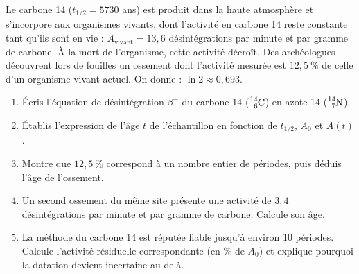 \documentclass[11pt]{article}
\begin{document}
\begin{exercice}
Le carbone 14 ($t_{1/2} = 5730$ ans) est produit dans la haute atmosphère et s'incorpore aux organismes vivants, dont l'activité en carbone 14 reste constante tant qu'ils sont en vie : $A_{\mathrm{vivant}} = 13,6$ désintégrations par minute et par gramme de carbone. À la mort de l'organisme, cette activité décroît.
Des archéologues découvrent lors de fouilles un ossement dont l'activité mesurée est $12,5\ \%$ de celle d'un organisme vivant actuel.
On donne : $\ln 2 \approx 0,693$.
\begin{enumerate}
\item Écris l'équation de désintégration $\beta^-$ du carbone 14 ($\ce{^{14}_{6}C}$) en azote 14 ($\ce{^{14}_{7}N}$).
\item Établis l'expression de l'âge $t$ de l'échantillon en fonction de $t_{1/2}$, $A_0$ et $A(t)$.
\item Montre que $12,5\ \%$ correspond à un nombre entier de périodes, puis déduis l'âge de l'ossement.
\item Un second ossement du même site présente une activité de $3,4$ désintégrations par minute et par gramme de carbone. Calcule son âge.
\item La méthode du carbone 14 est réputée fiable jusqu'à environ 10 périodes. Calcule l'activité résiduelle correspondante (en $\%$ de $A_0$) et explique pourquoi la datation devient incertaine au-delà.
\end{enumerate}
\end{exercice}
\end{document}
